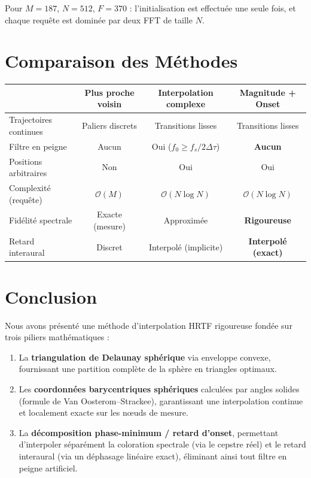 \documentclass[12pt, a4paper]{article}
\theoremstyle{definition}
\begin{document}
Pour $M = 187$, $N = 512$, $F = 370$ : l'initialisation est effectuée une
seule fois, et chaque requête est dominée par deux FFT de taille $N$.

\section{Comparaison des Méthodes}

\begin{center}
\renewcommand{\arraystretch}{1.4}
\begin{tabular}{lccc}
  \toprule
  & \textbf{Plus proche voisin} & \textbf{Interpolation complexe}
  & \textbf{Magnitude + Onset} \\
  \midrule
  Trajectoires continues     & Paliers discrets & Transitions lisses & Transitions lisses \\
  Filtre en peigne           & Aucun            & Oui ($f_0 \geq f_s/2\Delta\tau$) & \textbf{Aucun} \\
  Positions arbitraires      & Non              & Oui                & Oui \\
  Complexité (requête)       & $\mathcal{O}(M)$ & $\mathcal{O}(N\log N)$ & $\mathcal{O}(N\log N)$ \\
  Fidélité spectrale         & Exacte (mesure)  & Approximée         & \textbf{Rigoureuse} \\
  Retard interaural          & Discret          & Interpolé (implicite) & \textbf{Interpolé (exact)} \\
  \bottomrule
\end{tabular}
\end{center}

\section{Conclusion}

Nous avons présenté une méthode d'interpolation HRTF rigoureuse fondée sur
trois piliers mathématiques :
\begin{enumerate}
  \item La \textbf{triangulation de Delaunay sphérique} via enveloppe convexe,
    fournissant une partition complète de la sphère en triangles optimaux.
  \item Les \textbf{coordonnées barycentriques sphériques} calculées par
    angles solides (formule de Van Oosterom--Strackee), garantissant une
    interpolation continue et localement exacte sur les nœuds de mesure.
  \item La \textbf{décomposition phase-minimum / retard d'onset}, permettant
    d'interpoler séparément la coloration spectrale (via le cepstre réel) et
    le retard interaural (via un déphasage linéaire exact), éliminant ainsi
    tout filtre en peigne artificiel.
\end{enumerate}
\end{document}
